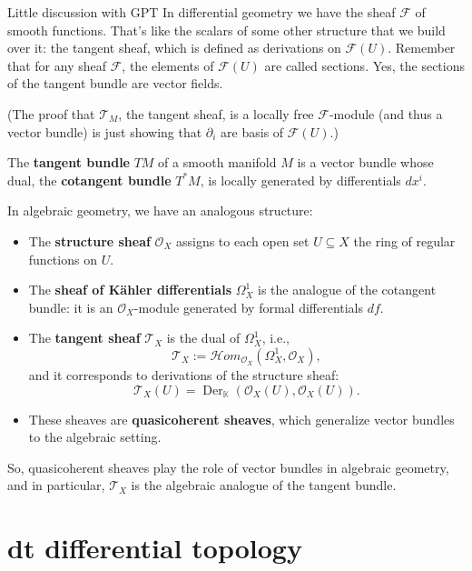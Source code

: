 \begin{thing6}{Little discussion with GPT}\leavevmode
In differential geometry we have the sheaf \(\mathcal{F}\) of smooth functions. That's like the scalars of some other structure that we build over it: the tangent sheaf, which is defined as derivations on \(\mathcal{F}(U)\). Remember that for any sheaf \(\mathcal{F}\), the elements of \(\mathcal{F}(U)\) are called sections. Yes, the sections of the tangent bundle are vector fields.

(The proof that \(\mathcal{T}_M\), the tangent sheaf, is a locally free \(\mathcal{F}\)-module (and thus a vector bundle) is just showing that \(\partial_i\) are basis of \(\mathcal{F}(U)\).)

The \textbf{tangent bundle} $TM$ of a smooth manifold $M$ is a vector bundle whose dual, the \textbf{cotangent bundle} $T^*M$, is locally generated by differentials $dx^i$.

	In algebraic geometry, we have an analogous structure:

\begin{itemize}
  \item The \textbf{structure sheaf} $\mathcal{O}_X$ assigns to each open set $U \subseteq X$ the ring of regular functions on $U$.
  \item The \textbf{sheaf of Kähler differentials} $\Omega^1_X$ is the analogue of the cotangent bundle: it is an $\mathcal{O}_X$-module generated by formal differentials $df$.
  \item The \textbf{tangent sheaf} $\mathcal{T}_X$ is the dual of $\Omega^1_X$, i.e.,
  \[
  \mathcal{T}_X := \mathcal{H}om_{\mathcal{O}_X}(\Omega^1_X, \mathcal{O}_X),
  \]
  and it corresponds to derivations of the structure sheaf:
  \[
  \mathcal{T}_X(U) = \operatorname{Der}_{\mathbb{K}}(\mathcal{O}_X(U), \mathcal{O}_X(U)).
  \]
  \item These sheaves are \textbf{quasicoherent sheaves}, which generalize vector bundles to the algebraic setting.
\end{itemize}

So, quasicoherent sheaves play the role of vector bundles in algebraic geometry, and in particular, $\mathcal{T}_X$ is the algebraic analogue of the tangent bundle.
\end{thing6}

\chapter{dt differential topology}

